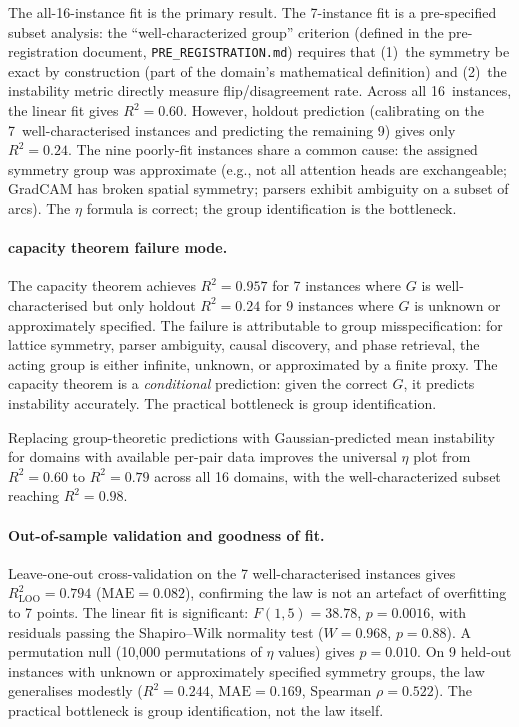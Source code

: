 \documentclass[11pt,a4paper]{article}
\begin{document}
The all-16-instance fit is the primary result.  The 7-instance fit is a
pre-specified subset analysis: the ``well-characterized group'' criterion
(defined in the pre-registration document, \texttt{PRE\_REGISTRATION.md})
requires that (1)~the symmetry be exact by construction (part of the domain's
mathematical definition) and (2)~the instability metric directly measure
flip/disagreement rate.  Across all 16~instances, the linear fit gives $R^2 = 0.60$.  However, holdout prediction (calibrating on the 7~well-characterised instances and predicting the remaining 9) gives only $R^2 = 0.24$.  The nine poorly-fit instances share a
common cause: the assigned symmetry group was approximate (e.g., not all
attention heads are exchangeable; GradCAM has broken spatial symmetry;
parsers exhibit ambiguity on a subset of arcs).  The $\eta$ formula is correct;
the group identification is the bottleneck.

\paragraph{capacity theorem failure mode.}
The capacity theorem achieves $R^2 = 0.957$ for 7 instances where $G$ is well-characterised but only holdout $R^2 = 0.24$ for 9 instances where $G$ is unknown or approximately specified. The failure is attributable to group misspecification: for lattice symmetry, parser ambiguity, causal discovery, and phase retrieval, the acting group is either infinite, unknown, or approximated by a finite proxy. The capacity theorem is a \emph{conditional} prediction: given the correct $G$, it predicts instability accurately. The practical bottleneck is group identification.

Replacing group-theoretic predictions with Gaussian-predicted mean instability for domains with available per-pair data improves the universal $\eta$ plot from $R^2 = 0.60$ to $R^2 = 0.79$ across all 16 domains, with the well-characterized subset reaching $R^2 = 0.98$.

\paragraph{Out-of-sample validation and goodness of fit.}
Leave-one-out cross-validation on the 7 well-characterised instances gives $R^2_{\text{LOO}} = 0.794$ ($\text{MAE} = 0.082$), confirming the law is not an artefact of overfitting to 7 points. The linear fit is significant: $F(1,5) = 38.78$, $p = 0.0016$, with residuals passing the Shapiro--Wilk normality test ($W = 0.968$, $p = 0.88$). A permutation null (10{,}000 permutations of $\eta$ values) gives $p = 0.010$. On 9 held-out instances with unknown or approximately specified symmetry groups, the law generalises modestly ($R^2 = 0.244$, $\text{MAE} = 0.169$, Spearman $\rho = 0.522$). The practical bottleneck is group identification, not the law itself.
\end{document}
